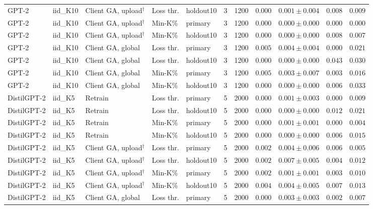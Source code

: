 \begin{table}[t]
\begin{tabular*}{\textwidth}{@{\extracolsep{\fill}}lllllcccccc@{}}
GPT-2 & iid\_K10 & Client GA, upload$^{\dagger}$ & Loss thr. & holdout10 & 3 & 1200 & $0.000$ & $0.001 \pm 0.004$ & $0.008$ & $0.009$ \\
GPT-2 & iid\_K10 & Client GA, upload$^{\dagger}$ & Min-K\% & primary & 3 & 1200 & $0.000$ & $0.000 \pm 0.000$ & $0.000$ & $0.000$ \\
GPT-2 & iid\_K10 & Client GA, upload$^{\dagger}$ & Min-K\% & holdout10 & 3 & 1200 & $0.000$ & $0.000 \pm 0.000$ & $0.008$ & $0.007$ \\
GPT-2 & iid\_K10 & Client GA, global & Loss thr. & primary & 3 & 1200 & $0.005$ & $0.004 \pm 0.004$ & $0.000$ & $0.021$ \\
GPT-2 & iid\_K10 & Client GA, global & Loss thr. & holdout10 & 3 & 1200 & $0.000$ & $0.000 \pm 0.000$ & $0.043$ & $0.030$ \\
GPT-2 & iid\_K10 & Client GA, global & Min-K\% & primary & 3 & 1200 & $0.005$ & $0.003 \pm 0.007$ & $0.003$ & $0.016$ \\
GPT-2 & iid\_K10 & Client GA, global & Min-K\% & holdout10 & 3 & 1200 & $0.000$ & $0.000 \pm 0.000$ & $0.006$ & $0.033$ \\
DistilGPT-2 & iid\_K5 & Retrain & Loss thr. & primary & 5 & 2000 & $0.000$ & $0.001 \pm 0.003$ & $0.000$ & $0.009$ \\
DistilGPT-2 & iid\_K5 & Retrain & Loss thr. & holdout10 & 5 & 2000 & $0.000$ & $0.000 \pm 0.000$ & $0.012$ & $0.021$ \\
DistilGPT-2 & iid\_K5 & Retrain & Min-K\% & primary & 5 & 2000 & $0.000$ & $0.001 \pm 0.001$ & $0.000$ & $0.004$ \\
DistilGPT-2 & iid\_K5 & Retrain & Min-K\% & holdout10 & 5 & 2000 & $0.000$ & $0.000 \pm 0.000$ & $0.006$ & $0.015$ \\
DistilGPT-2 & iid\_K5 & Client GA, upload$^{\dagger}$ & Loss thr. & primary & 5 & 2000 & $0.002$ & $0.004 \pm 0.006$ & $0.006$ & $0.005$ \\
DistilGPT-2 & iid\_K5 & Client GA, upload$^{\dagger}$ & Loss thr. & holdout10 & 5 & 2000 & $0.002$ & $0.007 \pm 0.005$ & $0.004$ & $0.012$ \\
DistilGPT-2 & iid\_K5 & Client GA, upload$^{\dagger}$ & Min-K\% & primary & 5 & 2000 & $0.002$ & $0.001 \pm 0.001$ & $0.003$ & $0.010$ \\
DistilGPT-2 & iid\_K5 & Client GA, upload$^{\dagger}$ & Min-K\% & holdout10 & 5 & 2000 & $0.004$ & $0.004 \pm 0.005$ & $0.007$ & $0.013$ \\
DistilGPT-2 & iid\_K5 & Client GA, global & Loss thr. & primary & 5 & 2000 & $0.000$ & $0.003 \pm 0.003$ & $0.002$ & $0.007$ \\

\end{tabular*}
\end{table}

